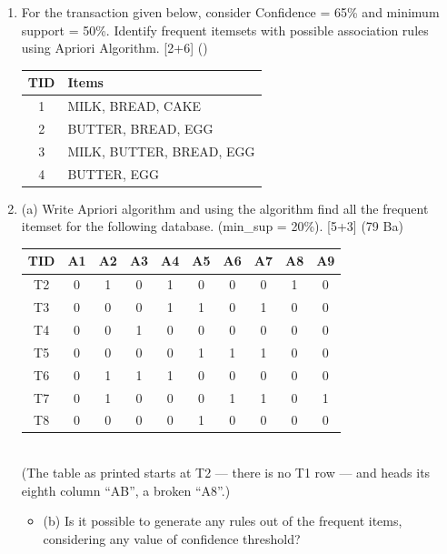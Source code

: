 \documentclass[12pt]{article}
\begin{document}
\begin{enumerate}[topsep=0pt, noitemsep]
      \item For the transaction given below, consider Confidence = 65\% and minimum support = 50\%. Identify frequent itemsets with possible association rules using Apriori Algorithm. \hfill [2+6] ()\\
        \small
        \begin{tabular}{|c|l|}
          \hline
          TID & Items \\ \hline
          1 & MILK, BREAD, CAKE \\ \hline
          2 & BUTTER, BREAD, EGG \\ \hline
          3 & MILK, BUTTER, BREAD, EGG \\ \hline
          4 & BUTTER, EGG \\ \hline
        \end{tabular}
        \normalsize

      \item (a) Write Apriori algorithm and using the algorithm find all the frequent itemset for the following database. (min\_sup = 20\%). \hfill [5+3] (79 Ba)\\
        \small
        \begin{tabular}{|c|c|c|c|c|c|c|c|c|c|}
          \hline
          TID & A1 & A2 & A3 & A4 & A5 & A6 & A7 & A8 & A9 \\ \hline
          T2 & 0 & 1 & 0 & 1 & 0 & 0 & 0 & 1 & 0 \\ \hline
          T3 & 0 & 0 & 0 & 1 & 1 & 0 & 1 & 0 & 0 \\ \hline
          T4 & 0 & 0 & 1 & 0 & 0 & 0 & 0 & 0 & 0 \\ \hline
          T5 & 0 & 0 & 0 & 0 & 1 & 1 & 1 & 0 & 0 \\ \hline
          T6 & 0 & 1 & 1 & 1 & 0 & 0 & 0 & 0 & 0 \\ \hline
          T7 & 0 & 1 & 0 & 0 & 0 & 1 & 1 & 0 & 1 \\ \hline
          T8 & 0 & 0 & 0 & 0 & 1 & 0 & 0 & 0 & 0 \\ \hline
        \end{tabular}
        \normalsize\\
        (The table as printed starts at T2 --- there is no T1 row --- and heads its eighth column ``AB'', a broken ``A8''.)
        \begin{itemize}[topsep=2pt,noitemsep,label={}]
          \item (b) Is it possible to generate any rules out of the frequent items, considering any value of confidence threshold?
        \end{itemize}


\end{enumerate}
\end{document}
